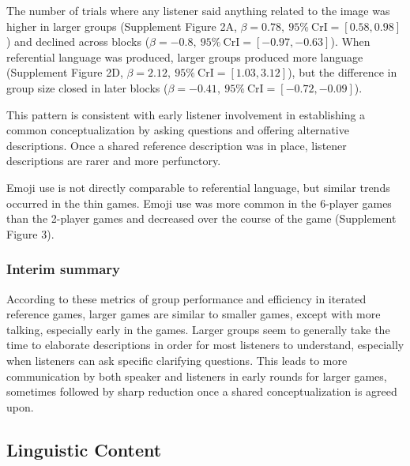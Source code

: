\documentclass[
  english,
  a4paper,
]{article}
\begin{document}
The number of trials where any listener said anything related to the image was higher in larger groups (Supplement Figure 2A, \(\beta=0.78,\:95\%\:\mathrm{CrI}=[0.58, 0.98]\)) and declined across blocks (\(\beta=-0.8,\:95\%\:\mathrm{CrI}=[-0.97, -0.63]\)). When referential language was produced, larger groups produced more language (Supplement Figure 2D, \(\beta=2.12,\:95\%\:\mathrm{CrI}=[1.03, 3.12]\)), but the difference in group size closed in later blocks (\(\beta=-0.41,\:95\%\:\mathrm{CrI}=[-0.72, -0.09]\)).

This pattern is consistent with early listener involvement in establishing a common conceptualization by asking questions and offering alternative descriptions. Once a shared reference description was in place, listener descriptions are rarer and more perfunctory.

Emoji use is not directly comparable to referential language, but similar trends occurred in the thin games. Emoji use was more common in the 6-player games than the 2-player games and decreased over the course of the game (Supplement Figure 3).

\hypertarget{interim-summary}{%
\subsubsection{Interim summary}\label{interim-summary}}

According to these metrics of group performance and efficiency in iterated reference games, larger games are similar to smaller games, except with more talking, especially early in the games. Larger groups seem to generally take the time to elaborate descriptions in order for most listeners to understand, especially when listeners can ask specific clarifying questions. This leads to more communication by both speaker and listeners in early rounds for larger games, sometimes followed by sharp reduction once a shared conceptualization is agreed upon.

\hypertarget{linguistic-content}{%
\subsection{Linguistic Content}\label{linguistic-content}}
\end{document}
